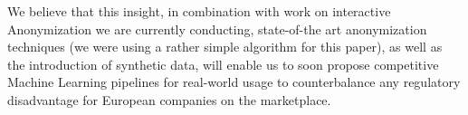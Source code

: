 \documentclass{llncs}
\begin{document}

We believe that this insight, in combination with work on interactive Anonymization we are currently conducting, state-of-the art anonymization techniques (we were using a rather simple algorithm for this paper), as well as the introduction of synthetic data, will enable us to soon propose competitive Machine Learning pipelines for real-world usage to counterbalance any regulatory disadvantage for European companies on the marketplace.

\clearpage
\newpage



\end{document}
